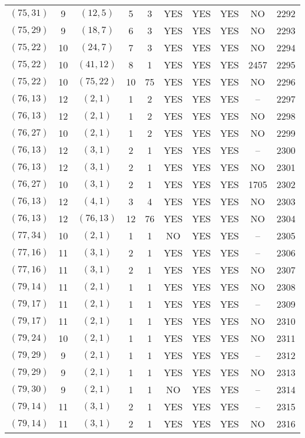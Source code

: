 \begin{longtable}{|c|c|c|c|c|c|c|c|c|c|}
$(75, 31)$ & 9 & $(12, 5)$ & 5 & 3 & YES & YES & YES & NO & 2292\\
$(75, 29)$ & 9 & $(18, 7)$ & 6 & 3 & YES & YES & YES & NO & 2293\\
$(75, 22)$ & 10 & $(24, 7)$ & 7 & 3 & YES & YES & YES & NO & 2294\\
$(75, 22)$ & 10 & $(41, 12)$ & 8 & 1 & YES & YES & YES & 2457 & 2295\\
$(75, 22)$ & 10 & $(75, 22)$ & 10 & 75 & YES & YES & YES & NO & 2296\\
$(76, 13)$ & 12 & $(2, 1)$ & 1 & 2 & YES & YES & YES & -- & 2297\\
$(76, 13)$ & 12 & $(2, 1)$ & 1 & 2 & YES & YES & YES & NO & 2298\\
$(76, 27)$ & 10 & $(2, 1)$ & 1 & 2 & YES & YES & YES & NO & 2299\\
$(76, 13)$ & 12 & $(3, 1)$ & 2 & 1 & YES & YES & YES & -- & 2300\\
$(76, 13)$ & 12 & $(3, 1)$ & 2 & 1 & YES & YES & YES & NO & 2301\\
$(76, 27)$ & 10 & $(3, 1)$ & 2 & 1 & YES & YES & YES & 1705 & 2302\\
$(76, 13)$ & 12 & $(4, 1)$ & 3 & 4 & YES & YES & YES & NO & 2303\\
$(76, 13)$ & 12 & $(76, 13)$ & 12 & 76 & YES & YES & YES & NO & 2304\\
$(77, 34)$ & 10 & $(2, 1)$ & 1 & 1 & NO & YES & YES & -- & 2305\\
$(77, 16)$ & 11 & $(3, 1)$ & 2 & 1 & YES & YES & YES & -- & 2306\\
$(77, 16)$ & 11 & $(3, 1)$ & 2 & 1 & YES & YES & YES & NO & 2307\\
$(79, 14)$ & 11 & $(2, 1)$ & 1 & 1 & YES & YES & YES & NO & 2308\\
$(79, 17)$ & 11 & $(2, 1)$ & 1 & 1 & YES & YES & YES & -- & 2309\\
$(79, 17)$ & 11 & $(2, 1)$ & 1 & 1 & YES & YES & YES & NO & 2310\\
$(79, 24)$ & 10 & $(2, 1)$ & 1 & 1 & YES & YES & YES & NO & 2311\\
$(79, 29)$ & 9 & $(2, 1)$ & 1 & 1 & YES & YES & YES & -- & 2312\\
$(79, 29)$ & 9 & $(2, 1)$ & 1 & 1 & YES & YES & YES & NO & 2313\\
$(79, 30)$ & 9 & $(2, 1)$ & 1 & 1 & NO & YES & YES & -- & 2314\\
$(79, 14)$ & 11 & $(3, 1)$ & 2 & 1 & YES & YES & YES & -- & 2315\\
$(79, 14)$ & 11 & $(3, 1)$ & 2 & 1 & YES & YES & YES & NO & 2316\\

\end{longtable}
